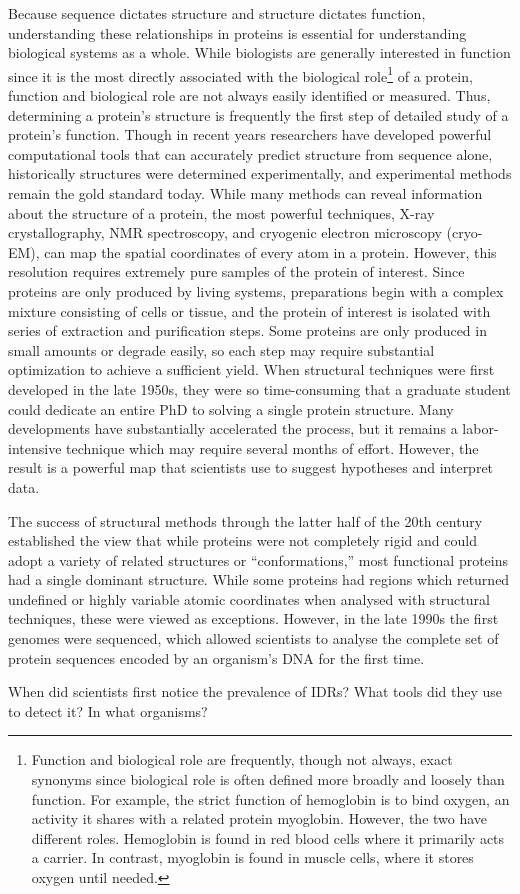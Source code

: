 Because sequence dictates structure and structure dictates function, understanding these relationships in proteins is essential for understanding biological systems as a whole. While biologists are generally interested in function since it is the most directly associated with the biological role\footnote{Function and biological role are frequently, though not always, exact synonyms since biological role is often defined more broadly and loosely than function. For example, the strict function of hemoglobin is to bind oxygen, an activity it shares with a related protein myoglobin. However, the two have different roles. Hemoglobin is found in red blood cells where it primarily acts a carrier. In contrast, myoglobin is found in muscle cells, where it stores oxygen until needed.} of a protein, function and biological role are not always easily identified or measured. Thus, determining a protein's structure is frequently the first step of detailed study of a protein's function. Though in recent years researchers have developed powerful computational tools that can accurately predict structure from sequence alone, historically structures were determined experimentally, and experimental methods remain the gold standard today. While many methods can reveal information about the structure of a protein, the most powerful techniques, X-ray crystallography, NMR spectroscopy, and cryogenic electron microscopy (cryo-EM), can map the spatial coordinates of every atom in a protein. However, this resolution requires extremely pure samples of the protein of interest. Since proteins are only produced by living systems, preparations begin with a complex mixture consisting of cells or tissue, and the protein of interest is isolated with series of extraction and purification steps. Some proteins are only produced in small amounts or degrade easily, so each step may require substantial optimization to achieve a sufficient yield. When structural techniques were first developed in the late 1950s, they were so time-consuming that a graduate student could dedicate an entire PhD to solving a single protein structure. Many developments have substantially accelerated the process, but it remains a labor-intensive technique which may require several months of effort. However, the result is a powerful map that scientists use to suggest hypotheses and interpret data.

The success of structural methods through the latter half of the 20th century established the view that while proteins were not completely rigid and could adopt a variety of related structures or ``conformations,'' most functional proteins had a single dominant structure. While some proteins had regions which returned undefined or highly variable atomic coordinates when analysed with structural techniques, these were viewed as exceptions. However, in the late 1990s the first genomes were sequenced, which allowed scientists to analyse the complete set of protein sequences encoded by an organism's DNA for the first time.

When did scientists first notice the prevalence of IDRs?
What tools did they use to detect it?
In what organisms?